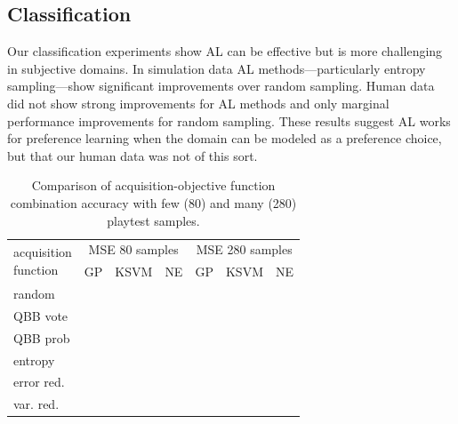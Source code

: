 \documentclass{sig-alternate}
\begin{document}
\subsection{Classification}
Our classification experiments show AL can be effective but is more challenging in subjective domains.
In simulation data AL methods---particularly entropy sampling---show significant improvements over random sampling.
Human data did not show strong improvements for AL methods and only marginal performance improvements for random sampling.
These results suggest AL works for preference learning when the domain can be modeled as a preference choice, but that our human data was not of this sort.


\begin{table}[tb]
\centering
\caption{Comparison of acquisition-objective function combination accuracy with few (80) and many (280) playtest samples.}
\begin{tabularx}{0.46\textwidth}{|X|c|c|c|c|c|c|}
\hline \multirow{2}{*}{\parbox[t]{5cm}{acquisition \\ function}} & \multicolumn{3}{|c|}{MSE 80 samples} & \multicolumn{3}{|c|}{MSE 280 samples}  \\ \cline{2-7}
& GP & KSVM & NE & GP & KSVM & NE \\ 
\hline random &  &  &  &  &  &  \\ 
\hline QBB vote &  &  &  &  &  &  \\ 
\hline QBB prob &  &  &  &  &  &  \\ 
\hline entropy &  &  &  &  &  &  \\ 
\hline error red. &  &  &  &  &  &  \\ 
\hline var. red. &  &  &  &  &  &  \\ 
\hline 
\end{tabularx}
\label{tab:cls_sim}
\end{table}
\end{document}
